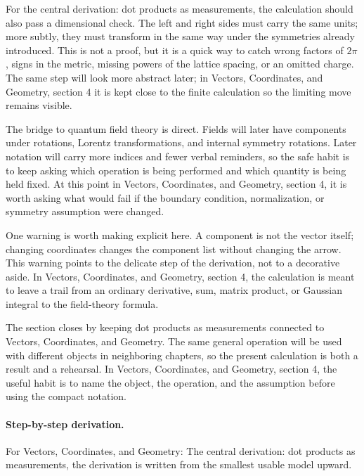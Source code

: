 For the central derivation: dot products as measurements, the calculation should also pass a dimensional check.  The left and right sides must carry the same units; more subtly, they must transform in the same way under the symmetries already introduced.  This is not a proof, but it is a quick way to catch wrong factors of \(2\pi\), signs in the metric, missing powers of the lattice spacing, or an omitted charge.  The same step will look more abstract later; in Vectors, Coordinates, and Geometry, section 4 it is kept close to the finite calculation so the limiting move remains visible.

The bridge to quantum field theory is direct.  Fields will later have components under rotations, Lorentz transformations, and internal symmetry rotations.  Later notation will carry more indices and fewer verbal reminders, so the safe habit is to keep asking which operation is being performed and which quantity is being held fixed.  At this point in Vectors, Coordinates, and Geometry, section 4, it is worth asking what would fail if the boundary condition, normalization, or symmetry assumption were changed.

One warning is worth making explicit here.  A component is not the vector itself; changing coordinates changes the component list without changing the arrow.  This warning points to the delicate step of the derivation, not to a decorative aside.  In Vectors, Coordinates, and Geometry, section 4, the calculation is meant to leave a trail from an ordinary derivative, sum, matrix product, or Gaussian integral to the field-theory formula.

The section closes by keeping dot products as measurements connected to Vectors, Coordinates, and Geometry.  The same general operation will be used with different objects in neighboring chapters, so the present calculation is both a result and a rehearsal.  In Vectors, Coordinates, and Geometry, section 4, the useful habit is to name the object, the operation, and the assumption before using the compact notation.



\paragraph{Step-by-step derivation.}

For Vectors, Coordinates, and Geometry: The central derivation: dot products as measurements, the derivation is written from the smallest usable model upward.


